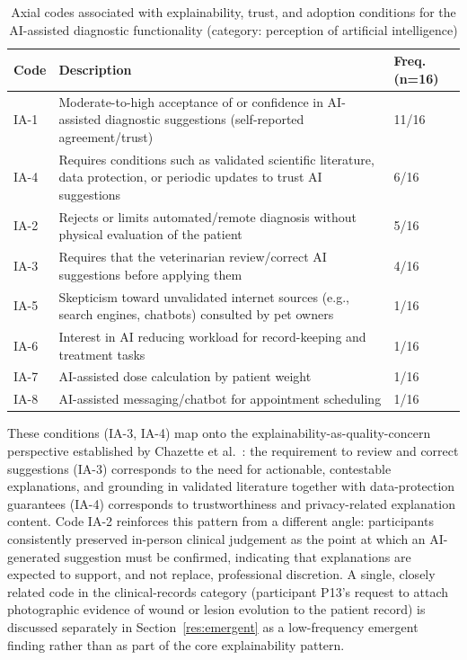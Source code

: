\documentclass[pdflatex,sn-mathphys-num,Numbered]{sn-jnl}
\begin{document}
\begin{table}[tp]
\caption{Axial codes associated with explainability, trust, and adoption conditions for the AI-assisted diagnostic functionality (category: perception of artificial intelligence)}
\label{tab2}
\centering
\scriptsize
\setlength{\tabcolsep}{3pt}
\renewcommand{\arraystretch}{0.95}
\begin{tabular}{@{}p{0.9cm}p{6.4cm}p{1.2cm}@{}}
\toprule
Code & Description & Freq. (n=16) \\
\midrule
IA-1 & Moderate-to-high acceptance of or confidence in AI-assisted diagnostic suggestions (self-reported agreement/trust) & 11/16 \\
IA-4 & Requires conditions such as validated scientific literature, data protection, or periodic updates to trust AI suggestions & 6/16 \\
IA-2 & Rejects or limits automated/remote diagnosis without physical evaluation of the patient & 5/16 \\
IA-3 & Requires that the veterinarian review/correct AI suggestions before applying them & 4/16 \\
IA-5 & Skepticism toward unvalidated internet sources (e.g., search engines, chatbots) consulted by pet owners & 1/16 \\
IA-6 & Interest in AI reducing workload for record-keeping and treatment tasks & 1/16 \\
IA-7 & AI-assisted dose calculation by patient weight & 1/16 \\
IA-8 & AI-assisted messaging/chatbot for appointment scheduling & 1/16 \\
\bottomrule
\end{tabular}
\end{table}

These conditions (IA-3, IA-4) map onto the explainability-as-quality-concern perspective established by Chazette et al.~\cite{chazette2020,chazette2021,chazette2022}: the requirement to review and correct suggestions (IA-3) corresponds to the need for actionable, contestable explanations, and grounding in validated literature together with data-protection guarantees (IA-4) corresponds to trustworthiness and privacy-related explanation content. Code IA-2 reinforces this pattern from a different angle: participants consistently preserved in-person clinical judgement as the point at which an AI-generated suggestion must be confirmed, indicating that explanations are expected to support, and not replace, professional discretion. A single, closely related code in the clinical-records category (participant P13's request to attach photographic evidence of wound or lesion evolution to the patient record) is discussed separately in Section~\ref{res:emergent} as a low-frequency emergent finding rather than as part of the core explainability pattern.
\end{document}
